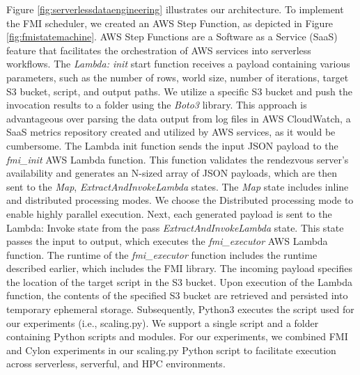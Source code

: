 Figure \ref{fig:serverlessdataengineering} illustrates our architecture. To implement the FMI scheduler, we created an AWS Step Function, as depicted in Figure \ref{fig:fmistatemachine}. AWS Step Functions are a Software as a Service (SaaS) feature that facilitates the orchestration of AWS services into serverless workflows. The \textit{Lambda: init} start function receives a payload containing various parameters, such as the number of rows, world size, number of iterations, target S3 bucket, script, and output paths. We utilize a specific S3 bucket and push the invocation results to a folder using the \textit{Boto3} library. This approach is advantageous over parsing the data output from log files in AWS CloudWatch, a SaaS metrics repository created and utilized by AWS services, as it would be cumbersome. The Lambda init function sends the input JSON payload to the \textit{fmi\_init} AWS Lambda function. This function validates the rendezvous server’s availability and generates an N-sized array of JSON payloads, which are then sent to the \textit{Map}, \textit{ExtractAndInvokeLambda} states. The \textit{Map} state includes inline and distributed processing modes.   We choose the Distributed processing mode to enable highly parallel execution. Next, each generated payload is sent to the Lambda: Invoke state from the pass \textit{ExtractAndInvokeLambda} state.  This state passes the input to output, which executes the \textit{fmi\_executor} AWS Lambda function. The runtime of the \textit{fmi\_executor} function includes the runtime described earlier, which includes the FMI library. The incoming payload specifies the location of the target script in the S3 bucket. Upon execution of the Lambda function, the contents of the specified S3 bucket are retrieved and persisted into temporary ephemeral storage. Subsequently, Python3 executes the script used for our experiments (i.e., scaling.py). We support a single script and a folder containing Python scripts and modules. For our experiments, we combined FMI and Cylon experiments in our scaling.py Python script to facilitate execution across serverless, serverful, and HPC environments\cite{cloudmeshcommon}. 



